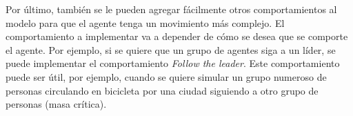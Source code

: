\documentclass[a4paper,10pt]{article}
\begin{document}
Por último, también se le pueden agregar fácilmente otros comportamientos al modelo para que el agente tenga un movimiento más complejo. El comportamiento a implementar va a depender de cómo se desea que se comporte el agente. Por ejemplo, si se quiere que un grupo de agentes siga a un líder, se puede implementar el comportamiento \textit{Follow the leader}. Este comportamiento puede ser útil, por ejemplo, cuando se quiere simular un grupo numeroso de personas circulando en bicicleta por una ciudad siguiendo a otro grupo de personas (masa crítica). 
\end{document}
